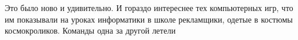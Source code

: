 
Это было ново и удивительно. И гораздо интереснее тех компьютерных игр, что им показывали на уроках информатики в школе рекламщики, одетые в костюмы космокроликов. Команды одна за другой летели
